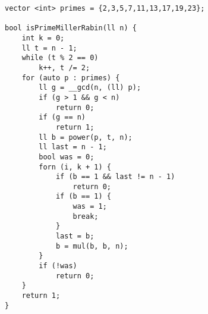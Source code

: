 \begin{verbatim}
vector <int> primes = {2,3,5,7,11,13,17,19,23};

bool isPrimeMillerRabin(ll n) {
	int k = 0;
	ll t = n - 1;
	while (t % 2 == 0)
		k++, t /= 2;
	for (auto p : primes) {
		ll g = __gcd(n, (ll) p);
		if (g > 1 && g < n)
			return 0;
		if (g == n)
			return 1;
		ll b = power(p, t, n);
		ll last = n - 1;
		bool was = 0;
		forn (i, k + 1) {
			if (b == 1 && last != n - 1)
				return 0;
			if (b == 1) {
				was = 1;
				break;	
			}
			last = b;
			b = mul(b, b, n);
		}
		if (!was)	
			return 0;
	}
	return 1;
}
\end{verbatim}
